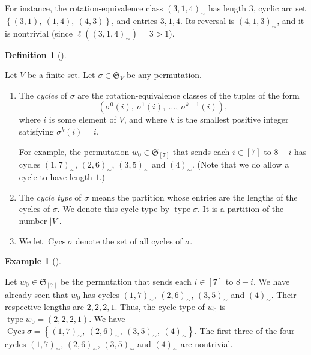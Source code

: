 \documentclass[numbers=enddot,12pt,final,onecolumn,notitlepage]{scrartcl}%
\numberwithin{exer}{section}
\theoremstyle{definition}
\newtheorem{defi}[theo]{Definition}
\newenvironment{definition}[1][]
{\begin{defi}[#1]\begin{leftbar}}
{\end{leftbar}\end{defi}}
\newtheorem{exam}[theo]{Example}
\newenvironment{example}[1][]
{\begin{exam}[#1]\begin{leftbar}}
{\end{leftbar}\end{exam}}
\begin{document}
For instance, the rotation-equivalence class $\left(  3,1,4\right)  _{\sim}$
has length $3$, cyclic arc set $\left\{  \left(  3,1\right)  ,\ \left(
1,4\right)  ,\ \left(  4,3\right)  \right\}  $, and entries $3,1,4$. Its
reversal is $\left(  4,1,3\right)  _{\sim}$, and it is nontrivial (since
$\ell\left(  \left(  3,1,4\right)  _{\sim}\right)  =3>1$).

\begin{definition}
\label{def.perm.cycs}Let $V$ be a finite set. Let $\sigma\in\mathfrak{S}_{V}$
be any permutation.

\begin{enumerate}
\item[\textbf{(a)}] The \emph{cycles} of $\sigma$ are the rotation-equivalence
classes of the tuples of the form%
\[
\left(  \sigma^{0}\left(  i\right)  ,\ \sigma^{1}\left(  i\right)
,\ \ldots,\ \sigma^{k-1}\left(  i\right)  \right)  ,
\]
where $i$ is some element of $V$, and where $k$ is the smallest positive
integer satisfying $\sigma^{k}\left(  i\right)  =i$.

For example, the permutation $w_{0}\in\mathfrak{S}_{\left[  7\right]  }$ that
sends each $i\in\left[  7\right]  $ to $8-i$ has cycles $\left(  1,7\right)
_{\sim}$, $\left(  2,6\right)  _{\sim}$, $\left(  3,5\right)  _{\sim}$ and
$\left(  4\right)  _{\sim}$. (Note that we do allow a cycle to have length $1$.)

\item[\textbf{(b)}] The \emph{cycle type} of $\sigma$ means the partition
whose entries are the lengths of the cycles of $\sigma$. We denote this cycle
type by $\operatorname*{type}\sigma$. It is a partition of the number
$\left\vert V\right\vert $.

\item[\textbf{(c)}] We let $\operatorname*{Cycs}\sigma$ denote the set of all
cycles of $\sigma$.
\end{enumerate}
\end{definition}

\begin{example}
Let $w_{0}\in\mathfrak{S}_{\left[  7\right]  }$ be the permutation that sends
each $i\in\left[  7\right]  $ to $8-i$. We have already seen that $w_{0}$ has
cycles $\left(  1,7\right)  _{\sim}$, $\left(  2,6\right)  _{\sim}$, $\left(
3,5\right)  _{\sim}$ and $\left(  4\right)  _{\sim}$. Their respective lengths
are $2,2,2,1$. Thus, the cycle type of $w_{0}$ is $\operatorname*{type}%
w_{0}=\left(  2,2,2,1\right)  $. We have $\operatorname*{Cycs}\sigma=\left\{
\left(  1,7\right)  _{\sim},\ \left(  2,6\right)  _{\sim},\ \left(
3,5\right)  _{\sim},\ \left(  4\right)  _{\sim}\right\}  $. The first three of
the four cycles $\left(  1,7\right)  _{\sim}$, $\left(  2,6\right)  _{\sim}$,
$\left(  3,5\right)  _{\sim}$ and $\left(  4\right)  _{\sim}$ are nontrivial.
\end{example}
\end{document}
